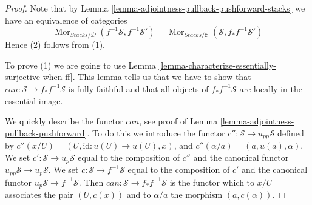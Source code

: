 \documentclass{stacks-project}
\theoremstyle{plain}
\theoremstyle{definition}
\theoremstyle{remark}
\numberwithin{equation}{subsection}
\def\Mor{\mathop{\mathrm{Mor}}\nolimits}
\begin{document}
\begin{proof}
Note that by
Lemma \ref{lemma-adjointness-pullback-pushforward-stacks}
we have an equivalence of categories
$$
\Mor_{\textit{Stacks}/\mathcal{D}}(f^{-1}\mathcal{S}, f^{-1}\mathcal{S}')
=
\Mor_{\textit{Stacks}/\mathcal{C}}(\mathcal{S}, f_*f^{-1}\mathcal{S}')
$$
Hence (2) follows from (1).

\medskip\noindent
To prove (1) we are going to use
Lemma \ref{lemma-characterize-essentially-surjective-when-ff}.
This lemma tells us that we have to show that
$can : \mathcal{S} \to f_*f^{-1}\mathcal{S}$ is
fully faithful and that all objects of $f_*f^{-1}\mathcal{S}$
are locally in the essential image.

\medskip\noindent
We quickly describe the functor $can$, see proof of
Lemma \ref{lemma-adjointness-pullback-pushforward}.
To do this we introduce the functor
$c'' : \mathcal{S} \to u_{pp}\mathcal{S}$ defined by
$c''(x/U) = (U, \text{id} : u(U) \to u(U), x)$, and
$c''(\alpha/a) = (a, u(a), \alpha)$. We set
$c' : \mathcal{S} \to u_p\mathcal{S}$ equal to the composition
of $c''$ and the canonical functor $u_{pp}\mathcal{S} \to u_p\mathcal{S}$.
We set $c : \mathcal{S} \to f^{-1}\mathcal{S}$ equal to the composition
of $c'$ and the canonical functor $u_p\mathcal{S} \to f^{-1}\mathcal{S}$.
Then $can : \mathcal{S} \to f_*f^{-1}\mathcal{S}$ is the functor
which to $x/U$ associates the pair $(U, c(x))$ and to
$\alpha/a$ the morphism $(a, c(\alpha))$.


\end{proof}
\end{document}
